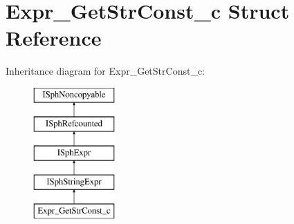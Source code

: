 \hypertarget{structExpr__GetStrConst__c}{\section{Expr\-\_\-\-Get\-Str\-Const\-\_\-c Struct Reference}
\label{structExpr__GetStrConst__c}
}
Inheritance diagram for Expr\-\_\-\-Get\-Str\-Const\-\_\-c\-:\begin{figure}[H]
\begin{center}
\leavevmode
\includegraphics[height=5.000000cm]{structExpr__GetStrConst__c}
\end{center}
\end{figure}
